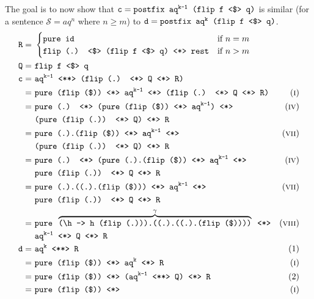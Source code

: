 The goal is to now show that $\texttt{c} = \texttt{postfix aq}^\texttt{k-1}\texttt{ (flip f \fmap q)}$ is similar (for a sentence $\mathcal{S} = aq^n$ where $n \geq m$) to $\texttt{d} = \texttt{postfix aq}^\texttt{k}\texttt{ (flip f \fmap q)}$.
\begin{align*}
    \texttt{R} =\ & \begin{cases}
        \texttt{pure id} & \text{if } n = m \\
        \texttt{flip (.) \fmap (flip f \fmap q) \ap rest} & \text{if } n > m
    \end{cases} \\
    \texttt{Q} =\ & \texttt{flip f \fmap q} \\
    \texttt{c} =\ & \texttt{aq}^\texttt{k-1}\texttt{ \pa (flip (.) \ap Q \ap R)} \\
    =\ & \texttt{pure (flip (\$)) \ap aq}^\texttt{k-1}\texttt{ \ap (flip (.) \ap Q \ap R)} & \equi[1] \\
    =\ & \texttt{pure (.) \ap (pure (flip (\$)) \ap aq}^\texttt{k-1}\texttt{) \ap} & \equi[4] \\
    & \texttt{(pure (flip (.)) \ap Q) \ap R} \\
    =\ & \texttt{pure (.).(flip (\$)) \ap aq}^\texttt{k-1}\texttt{ \ap} & \equi[7] \\
    & \texttt{(pure (flip (.)) \ap Q) \ap R} \\
    =\ & \texttt{pure (.) \ap (pure (.).(flip (\$)) \ap aq}^\texttt{k-1}\texttt{ \ap} & \equi[4] \\
    & \texttt{pure (flip (.)) \ap Q \ap R} \\
    =\ & \texttt{pure (.).((.).(flip (\$))) \ap aq}^\texttt{k-1}\texttt{ \ap} & \equi[7] \\
    & \texttt{pure (flip (.)) \ap Q \ap R} \\
    =\ & \texttt{pure }\overbrace{\texttt{(\textbackslash h -> h (flip (.))).((.).((.).(flip (\$))))}}^{\gamma}\texttt{ \ap} & \equi[8] \\
    & \texttt{aq}^\texttt{k-1}\texttt{ \ap Q \ap R} \\
    \texttt{d} =\ & \texttt{aq}^\texttt{k}\texttt{ \pa R} & \text{(1)} \\
    =\ & \texttt{pure (flip (\$)) \ap aq}^\texttt{k}\texttt{ \ap R} & \equi[1] \\
    =\ & \texttt{pure (flip (\$)) \ap (aq}^\texttt{k-1}\texttt{ \pa Q) \ap R} & \text{(2)} \\
    =\ & \texttt{pure (flip (\$)) \ap} & \equi[1] \\

\end{align*}
